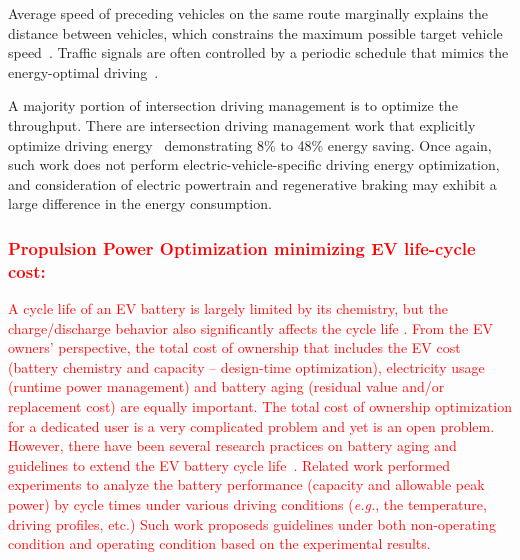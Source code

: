 Average speed of preceding vehicles on the same route marginally explains the distance between vehicles, which constrains the maximum possible target vehicle speed~\cite{Mensing:TR13,Lim:TVT17}. Traffic signals are often controlled by a periodic schedule that mimics the energy-optimal driving~\cite{Mandava:ITSC09,Asadi:TCST11,Ozatay:CDC13,Nunzio:JRNC15,Wu:ITS15}.

A majority portion of intersection driving management is to optimize the throughput. There are intersection driving management work that explicitly optimize driving energy~\cite{Nunzio:JRNC15,Wu:ITS15} demonstrating 8\% to 48\% energy saving. Once again, such work does not perform electric-vehicle-specific driving energy optimization, and consideration of electric powertrain and regenerative braking may exhibit a large difference in the energy consumption.
\textcolor{red}{
\subsubsection{Propulsion Power Optimization minimizing EV life-cycle cost:} \label{subsubsec:opt_life_cycle}
A cycle life of an EV battery is largely limited by its chemistry, but the charge/discharge behavior also significantly affects the cycle life \cite{Battery SoH model due to DOD - can Sarre:JPS04 be used here too?}. From the EV owners' perspective, the total cost of ownership that includes the EV cost (battery chemistry and capacity -- design-time optimization), electricity usage (runtime power management) and battery aging (residual value and/or replacement cost) are equally important. The total cost of ownership optimization for a dedicated user is a very complicated problem and yet is an open problem. 
%
However, there have been several research practices on battery aging and guidelines to extend the EV battery cycle life~\cite{Sarre:JPS04,Keil:PHD17}. Related work performed experiments to analyze the battery performance (capacity and allowable peak power) by cycle times under various driving conditions (\textit{e.g.}, the temperature, driving profiles, etc.) Such work proposeds guidelines under both non-operating condition and operating condition based on the experimental results.}
